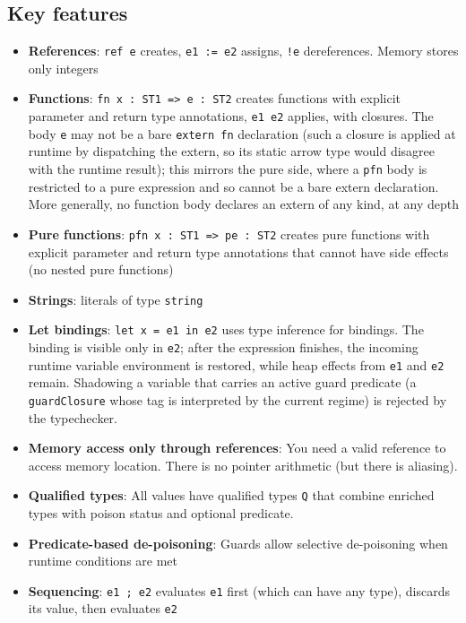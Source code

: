 \documentclass[12pt]{article}
\begin{document}
\subsection{Key features}
\begin{itemize}
    \item \textbf{References}: \texttt{ref e} creates, \texttt{e1 := e2} assigns, \texttt{!e} dereferences. Memory stores only integers
    \item \textbf{Functions}: \texttt{fn x : ST1 => e : ST2} creates functions with explicit parameter and return type annotations, \texttt{e1 e2} applies, with closures. The body \texttt{e} may not be a bare \texttt{extern fn} declaration (such a closure is applied at runtime by dispatching the extern, so its static arrow type would disagree with the runtime result); this mirrors the pure side, where a \texttt{pfn} body is restricted to a pure expression and so cannot be a bare extern declaration. More generally, no function body declares an extern of any kind, at any depth
    \item \textbf{Pure functions}: \texttt{pfn x : ST1 => pe : ST2} creates pure functions with explicit parameter and return type annotations that cannot have side effects (no nested pure functions)
    \item \textbf{Strings}: literals of type \texttt{string}
    \item \textbf{Let bindings}: \texttt{let x = e1 in e2} uses type inference for bindings.
      The binding is visible only in \texttt{e2}; after the expression finishes,
      the incoming runtime variable environment is restored, while heap effects
      from \texttt{e1} and \texttt{e2} remain.
      Shadowing a variable that carries an active guard predicate (a \texttt{guardClosure}
      whose tag is interpreted by the current regime) is rejected by the typechecker.
    \item \textbf{Memory access only through references}: You need a valid
    reference to access memory location. There is no pointer arithmetic (but
    there is aliasing).
    \item \textbf{Qualified types}: All values have qualified types \texttt{Q}
    that combine enriched types with poison status and optional predicate.
    \item \textbf{Predicate-based de-poisoning}: Guards allow selective de-poisoning when runtime conditions are met
    \item \textbf{Sequencing}: \texttt{e1 ; e2} evaluates \texttt{e1} first (which can have any type), discards its value, then evaluates \texttt{e2}
\end{itemize}
\end{document}
